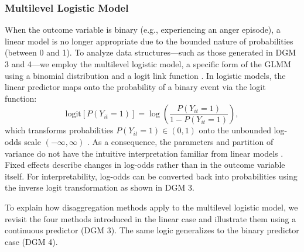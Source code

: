 \documentclass[stu]{apa7}
\begin{document}
\subsubsection{Multilevel Logistic Model}

When the outcome variable is binary (e.g., experiencing an anger episode), a linear model is no longer appropriate due to the bounded nature of probabilities (between 0 and 1). To analyze data structures—such as those generated in DGM 3 and 4—we employ the multilevel logistic model, a specific form of the GLMM using a binomial distribution and a logit link function \parencite{anderson_variance_1985, stiratelli_random-effects_1984}. In logistic models, the linear predictor maps onto the probability of a binary event via the logit function:
\[
\text{logit} \left[ P(Y_{it} = 1) \right]  = \log\left(\frac{P(Y_{it} = 1)}{1 - P(Y_{it} = 1)}\right),
\]
which transforms probabilities \(  P(Y_{it} = 1) \in (0, 1) \) onto the unbounded log-odds scale \( (-\infty, \infty) \) . As a consequence, the parameters and partition of variance do not have the intuitive interpretation familiar from linear models \parencite{merlo_brief_2006}. Fixed effects describe changes in log-odds rather than in the outcome variable itself. For interpretability, log-odds can be converted back into probabilities using the inverse logit transformation as shown in DGM 3.


To explain how disaggregation methods apply to the multilevel logistic model, we revisit the four methods introduced in the linear case and illustrate them using a continuous predictor (DGM 3). The same logic generalizes to the binary predictor case (DGM 4).
\end{document}
